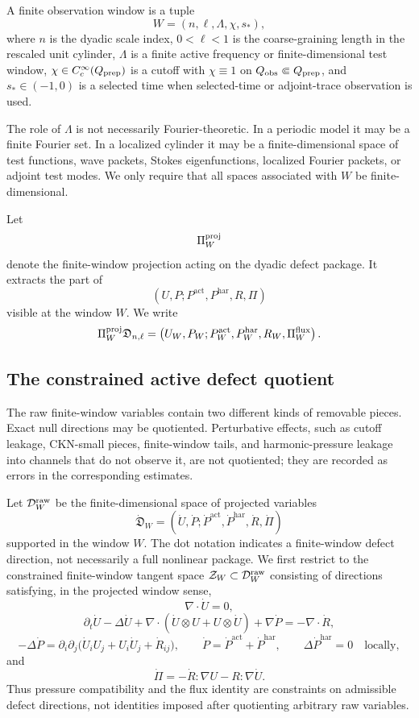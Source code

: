 \documentclass[11pt]{article}
\numberwithin{equation}{section}
\theoremstyle{plain}
\theoremstyle{definition}
\theoremstyle{remark}
\newcommand{\har}{\mathrm{har}}
\newcommand{\calD}{\mathcal D}
\newcommand{\calZ}{\mathcal Z}
\newcommand{\frakD}{\mathfrak D}
\newcommand{\act}{\mathrm{act}}
\begin{document}
A finite observation window is a tuple
\[
  W=(n,\ell,\Lambda,\chi,s_*),
\]
where \(n\) is the dyadic scale index, \(0<\ell<1\) is the coarse-graining length in the rescaled unit cylinder, \(\Lambda\) is a finite active frequency or finite-dimensional test window, \(\chi\in C_c^\infty(Q_{\rm prep})\) is a cutoff with \(\chi\equiv1\) on \(Q_{\rm obs}\Subset Q_{\rm prep}\), and \(s_*\in(-1,0)\) is a selected time when selected-time or adjoint-trace observation is used.

The role of \(\Lambda\) is not necessarily Fourier-theoretic.  In a periodic model it may be a finite Fourier set.  In a localized cylinder it may be a finite-dimensional space of test functions, wave packets, Stokes eigenfunctions, localized Fourier packets, or adjoint test modes.  We only require that all spaces associated with \(W\) be finite-dimensional.

Let
\[
  \Pi_W^{\rm proj}
\]
denote the finite-window projection acting on the dyadic defect package.  It extracts the part of
\[
  (U,P;P^{\act},P^{\har},R,\Pi)
\]
visible at the window \(W\).  We write
\[
  \Pi_W^{\rm proj}\frakD_{n,\ell}
  =
  \left(U_W,P_W;P_W^{\act},P_W^{\har},R_W,\Pi_W^{\rm flux}\right).
\]


\subsection{The constrained active defect quotient}

The raw finite-window variables contain two different kinds of removable pieces.  Exact null directions may be quotiented.  Perturbative effects, such as cutoff leakage, CKN-small pieces, finite-window tails, and harmonic-pressure leakage into channels that do not observe it, are not quotiented; they are recorded as errors in the corresponding estimates.

Let \(\calD_W^{\rm raw}\) be the finite-dimensional space of projected variables
\[
  \dot{\frakD}_W=(\dot U,\dot P;\dot P^{\act},\dot P^{\har},\dot R,\dot\Pi)
\]
supported in the window \(W\).  The dot notation indicates a finite-window defect direction, not necessarily a full nonlinear package.  We first restrict to the constrained finite-window tangent space \(\calZ_W\subset\calD_W^{\rm raw}\) consisting of directions satisfying, in the projected window sense,
\[
  \nabla\cdot \dot U=0,
\]
\[
  \partial_t\dot U-\Delta\dot U
  +\nabla\cdot(\dot U\otimes U+U\otimes\dot U)
  +\nabla\dot P
  =
  -\nabla\cdot\dot R,
\]
\[
  -\Delta\dot P
  =
  \partial_i\partial_j
  \bigl(\dot U_iU_j+U_i\dot U_j+\dot R_{ij}\bigr),
  \qquad
  \dot P=\dot P^{\act}+\dot P^{\har},
  \qquad
  \Delta\dot P^{\har}=0
  \quad\text{locally},
\]
and
\[
  \dot\Pi=-\dot R:\nabla U-R:\nabla\dot U.
\]
Thus pressure compatibility and the flux identity are constraints on admissible defect directions, not identities imposed after quotienting arbitrary raw variables.
\end{document}
